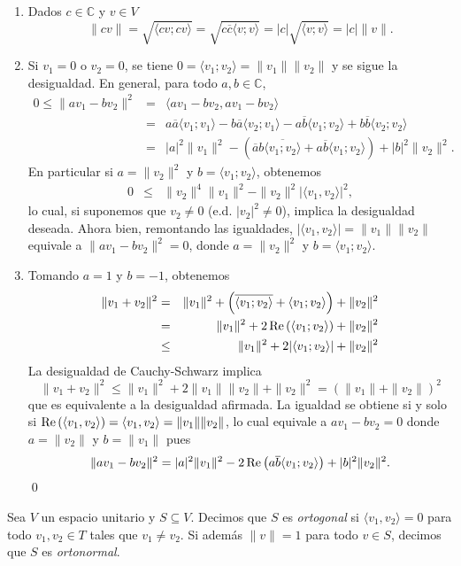 \dem\begin{enumerate}
\item Dados $c\in\mathbb{C}$ y $v\in V$
\[
\|cv\|=\sqrt{\langle cv;cv\rangle}=\sqrt{c\overline{c}\langle v;v\rangle}=|c|\sqrt{\langle v;v\rangle}=|c|\|v\|.
\]
\item Si $v_1=0$ o $v_2=0$, se tiene $0=\langle v_1;v_2\rangle=\|v_1\|\|v_2\|$ y se sigue la desigualdad. En general, para todo $a,b\in\mathbb{C}$,
\begin{eqnarray*}
0 \le \|av_1-bv_2\|^2 & = & \langle av_1-bv_2 , av_1-bv_2\rangle\\
   & = & a\overline{a}\langle v_1; v_1\rangle-b\overline{a}\langle v_2; v_1\rangle-a\overline{b}\langle v_1; v_2\rangle+b\overline{b}\langle v_2; v_2\rangle\\
   & = & |a|^2\|v_1\|^2-\left(\overline{a}b\overline{\langle v_1; v_2\rangle}+a\overline{b}\langle v_1; v_2\rangle\right)+|b|^2\|v_2\|^2.
\end{eqnarray*}
En particular si $a=\|v_2\|^2$ y $b=\langle v_1; v_2\rangle$, obtenemos
\begin{eqnarray*}
0 & \le & \|v_2\|^4\|v_1\|^2-\|v_2\|^2|\langle v_1, v_2\rangle|^2,
\end{eqnarray*}
lo cual, si suponemos que $v_2\ne 0$ (e.d. $|v_2|^2\ne 0$), implica la desigualdad deseada. Ahora bien, remontando las igualdades, $|\langle v_1,v_2\rangle|=\|v_1\|\|v_2\|$ equivale a $\|av_1-bv_2\|^2=0$, donde  $a=\|v_2\|^2$ y $b=\langle v_1; v_2\rangle$.
\item Tomando $a=1$ y $b=-1$, obtenemos
\begin{eqnarray*}
\|v_1+v_2\|^2 & = & \|v_1\|^2+\left(\overline{\langle v_1; v_2\rangle}+\langle v_1; v_2\rangle\right)+\|v_2\|^2\\
 & = & \|v_1\|^2+2\operatorname{Re}\left(\langle v_1; v_2\rangle\right)+\|v_2\|^2\\
 & \le & \|v_1\|^2+2|\langle v_1; v_2\rangle|+\|v_2\|^2
\end{eqnarray*}
La desigualdad de Cauchy-Schwarz implica
\[
\|v_1+v_2\|^2\le\|v_1\|^2+2\|v_1\|\|v_2\|+\|v_2\|^2=(\|v_1\|+\|v_2\|)^2
\]
que es equivalente a la desigualdad afirmada. La igualdad se obtiene si y solo si  $\operatorname{Re}\left(\langle v_1, v_2\rangle\right)=\langle v_1, v_2\rangle=\|v_1\|\|v_2\|$, lo cual equivale a $av_1-bv_2=0$ donde $a=\|v_2\|$ y $b=\|v_1\|$ pues
\[
\|av_1-bv_2\|^2=|a|^2\|v_1\|^2-2\operatorname{Re}\left(a\overline{b}\langle v_1; v_2\rangle\right)+|b|^2\|v_2\|^2.
\]
\qed
\end{enumerate}

\begin{defn}
Sea $V$ un espacio unitario y $S\subseteq V$. Decimos que $S$ es \emph{ortogonal} si $\langle v_1,v_2\rangle=0$ para todo $v_1,v_2\in T$ tales que $v_1\ne v_2$. Si adem\'as $\|v\|=1$ para todo $v\in S$, decimos que $S$ es \emph{ortonormal}.
\end{defn}

